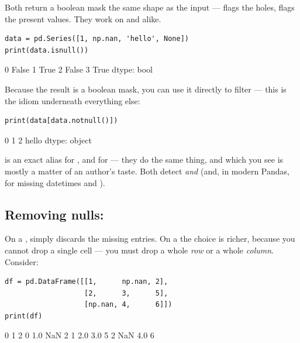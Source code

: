 \documentclass[11pt]{article}
\begin{document}
Both return a boolean mask the same shape as the input ---  flags the holes,  flags the present values. They work on  and  alike.

\begin{lstlisting}
data = pd.Series([1, np.nan, 'hello', None])
print(data.isnull())
\end{lstlisting}

\begin{outblock}
0    False
1     True
2    False
3     True
dtype: bool
\end{outblock}

Because the result is a boolean mask, you can use it directly to filter --- this is the idiom underneath everything else:

\begin{lstlisting}
print(data[data.notnull()])
\end{lstlisting}

\begin{outblock}
0        1
2    hello
dtype: object
\end{outblock}

\begin{pyrefresh}
 is an exact alias for , and  for  --- they do the same thing, and which you see is mostly a matter of an author's taste. Both detect  \emph{and}  (and, in modern Pandas,  for missing datetimes and ).
\end{pyrefresh}

\subsection{Removing nulls: }

On a ,  simply discards the missing entries. On a  the choice is richer, because you cannot drop a single cell --- you must drop a whole \emph{row} or a whole \emph{column}. Consider:

\begin{lstlisting}
df = pd.DataFrame([[1,      np.nan, 2],
                   [2,      3,      5],
                   [np.nan, 4,      6]])
print(df)
\end{lstlisting}

\begin{outblock}
     0    1  2
0  1.0  NaN  2
1  2.0  3.0  5
2  NaN  4.0  6
\end{outblock}
\end{document}
